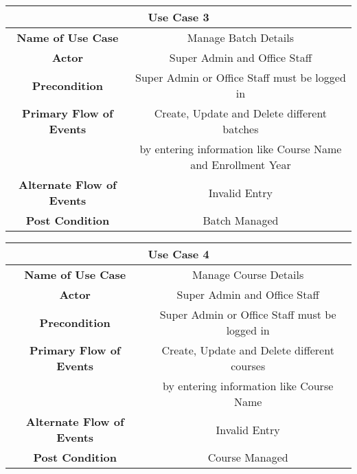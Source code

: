 \vspace{1cm}
\begin{center}
    \begin{tabular}{|c|c|}
        \hline
        \multicolumn{2}{|c|}{Use Case 3} \\
        \hline
        \textbf{Name of Use Case} & Manage Batch Details \\
        \hline
        \textbf{Actor} & Super Admin and Office Staff \\
        \hline
        \textbf{Precondition} & Super Admin or Office Staff must be logged in \\
        \hline
        \textbf{Primary Flow of Events} & Create, Update and Delete different batches \\
        & by entering information like Course Name and Enrollment Year \\
        \hline
        \textbf{Alternate Flow of Events} & Invalid Entry \\
        \hline
        \textbf{Post Condition} & Batch Managed \\
        \hline
    \end{tabular}
\end{center}

\vspace{1cm}
\begin{center}
    \begin{tabular}{|c|c|}
        \hline
        \multicolumn{2}{|c|}{Use Case 4} \\
        \hline
        \textbf{Name of Use Case} & Manage Course Details \\
        \hline
        \textbf{Actor} & Super Admin and Office Staff \\
        \hline
        \textbf{Precondition} & Super Admin or Office Staff must be logged in \\
        \hline
        \textbf{Primary Flow of Events} & Create, Update and Delete different courses \\
        & by entering information like Course Name \\
        \hline
        \textbf{Alternate Flow of Events} & Invalid Entry \\
        \hline
        \textbf{Post Condition} & Course Managed \\
        \hline
    \end{tabular}
\end{center}

